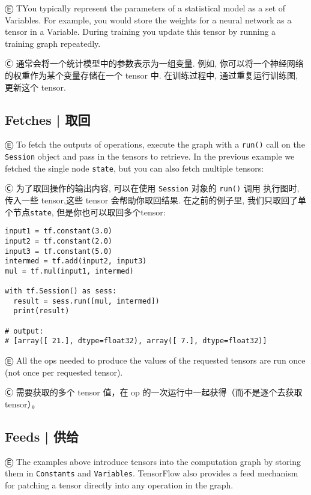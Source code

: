 Ⓔ \textcolor{etc}{TYou typically represent the parameters of a statistical model as a set of Variables. For example, you would store the weights for a neural network as a tensor in a Variable. During training you update this tensor by running a training graph repeatedly.}

Ⓒ 通常会将一个统计模型中的参数表示为一组变量. 例如, 你可以将一个神经网络的权重作为某个变量存储在一个 tensor 中. 在训练过程中, 通过重复运行训练图, 更新这个 tensor.


%
\subsection{Fetches  |  取回}

Ⓔ \textcolor{etc}{To fetch the outputs of operations, execute the graph with a \lstinline{run()} call on the \lstinline{Session} object and pass in the tensors to retrieve. In the previous example we fetched the single node \lstinline{state}, but you can also fetch multiple tensors:}

Ⓒ 为了取回操作的输出内容, 可以在使用 \lstinline{Session} 对象的 \lstinline{run()} 调用 执行图时, 传入一些 tensor,这些 tensor 会帮助你取回结果. 在之前的例子里, 我们只取回了单个节点\lstinline{state}, 但是你也可以取回多个tensor:

\begin{lstlisting}
input1 = tf.constant(3.0)
input2 = tf.constant(2.0)
input3 = tf.constant(5.0)
intermed = tf.add(input2, input3)
mul = tf.mul(input1, intermed)

with tf.Session() as sess:
  result = sess.run([mul, intermed])
  print(result)

# output:
# [array([ 21.], dtype=float32), array([ 7.], dtype=float32)]
\end{lstlisting}

Ⓔ \textcolor{etc}{All the ops needed to produce the values of the requested tensors are run once (not once per requested tensor).}

Ⓒ 需要获取的多个 tensor 值，在 op 的一次运行中一起获得（而不是逐个去获取 tensor）。

%
\subsection{Feeds  |  供给}

Ⓔ \textcolor{etc}{The examples above introduce tensors into the computation graph by storing them in \lstinline{Constants} and \lstinline{Variables}. TensorFlow also provides a feed mechanism for patching a tensor directly into any operation in the graph.}

